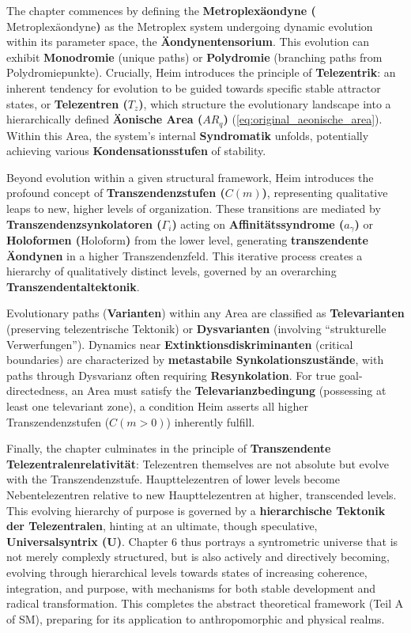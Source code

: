 \documentclass[
    12pt,              %
    a4paper,           %
    headings=normal,   %
    twoside=true,      %
    BCOR=8mm,          %
]{scrbook}
\newcommand{\q}[1]{\enquote{#1}}
\newcommand{\conceptualsyndrome}{a}
\newcommand{\universalquantor}{\bm{U}}
\newcommand{\holoform}{\text{Holoform}}
\newcommand{\metroplexaeondyne}{\text{Metroplexäondyne}}
\newcommand{\telezentrum}{T_z}
\newcommand{\aeonischearea}{AR_q}
\newcommand{\transzendenzstufe}[1]{C(#1)}
\newcommand{\transzendenzsynkolator}{\Gamma_i}
\begin{document}
The chapter commences by defining the \textbf{Metroplexäondyne (\(\metroplexaeondyne\))} as the Metroplex system undergoing dynamic evolution within its parameter space, the \textbf{Äondynentensorium}. This evolution can exhibit \textbf{Monodromie} (unique paths) or \textbf{Polydromie} (branching paths from Polydromiepunkte). Crucially, Heim introduces the principle of \textbf{Telezentrik}: an inherent tendency for evolution to be guided towards specific stable attractor states, or \textbf{Telezentren (\(\telezentrum\))}, which structure the evolutionary landscape into a hierarchically defined \textbf{Äonische Area (\(\aeonischearea\))} (\eqref{eq:original_aeonische_area}). Within this Area, the system’s internal \textbf{Syndromatik} unfolds, potentially achieving various \textbf{Kondensationsstufen} of stability.

Beyond evolution within a given structural framework, Heim introduces the profound concept of \textbf{Transzendenzstufen (\(\transzendenzstufe{m}\))}, representing qualitative leaps to new, higher levels of organization. These transitions are mediated by \textbf{Transzendenzsynkolatoren (\(\transzendenzsynkolator\))} acting on \textbf{Affinitätssyndrome (\(\conceptualsyndrome_\gamma\))} or \textbf{Holoformen (\(\holoform\))} from the lower level, generating \textbf{transzendente Äondynen} in a higher Transzendenzfeld. This iterative process creates a hierarchy of qualitatively distinct levels, governed by an overarching \textbf{Transzendentaltektonik}.

Evolutionary paths (\textbf{Varianten}) within any Area are classified as \textbf{Televarianten} (preserving telezentrische Tektonik) or \textbf{Dysvarianten} (involving \q{strukturelle Verwerfungen}). Dynamics near \textbf{Extinktionsdiskriminanten} (critical boundaries) are characterized by \textbf{metastabile Synkolationszustände}, with paths through Dysvarianz often requiring \textbf{Resynkolation}. For true goal-directedness, an Area must satisfy the \textbf{Televarianzbedingung} (possessing at least one televariant zone), a condition Heim asserts all higher Transzendenzstufen (\(\transzendenzstufe{m > 0}\)) inherently fulfill.

Finally, the chapter culminates in the principle of \textbf{Transzendente Telezentralenrelativität}: Telezentren themselves are not absolute but evolve with the Transzendenzstufe. Haupttelezentren of lower levels become Nebentelezentren relative to new Haupttelezentren at higher, transcended levels. This evolving hierarchy of purpose is governed by a \textbf{hierarchische Tektonik der Telezentralen}, hinting at an ultimate, though speculative, \textbf{Universalsyntrix (\(\universalquantor\))}. Chapter 6 thus portrays a syntrometric universe that is not merely complexly structured, but is also actively and directively becoming, evolving through hierarchical levels towards states of increasing coherence, integration, and purpose, with mechanisms for both stable development and radical transformation. This completes the abstract theoretical framework (Teil A of SM), preparing for its application to anthropomorphic and physical realms.
\end{document}
